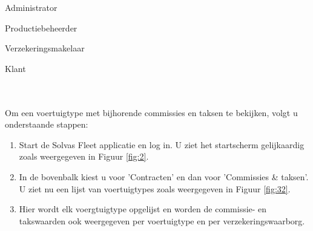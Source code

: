 \documentclass[11pt,openany]{article}
\newcommand{\cmark}{\ding{51}}%
\newcommand{\xmark}{\ding{55}}%
\newcommand{\done}{\rlap{$\square$}{\raisebox{2pt}{\large\hspace{1pt}\cmark}}%
	\hspace{-2.5pt}}
\newcommand{\wontfix}{\rlap{$\square$}{\large\hspace{1pt}\xmark}}
\begin{document}
\begin{todolist}
	\item[\done] Administrator
	\item[\done] Productiebeheerder
	\item[\done] Verzekeringsmakelaar
	\item[\wontfix] Klant 
\end{todolist}
\\
\\
Om een voertuigtype met bijhorende commissies en taksen te bekijken, volgt u onderstaande stappen:
\begin{enumerate}
	\item Start de Solvas Fleet applicatie en log in. U ziet het startscherm gelijkaardig zoals weergegeven in Figuur \ref{fig:2}.
	\item In de bovenbalk kiest u voor 'Contracten' en dan voor 'Commissies \& taksen'. U ziet nu een lijst van voertuigtypes zoals weergegeven in Figuur \ref{fig:32}.
	\item Hier wordt elk voergtuigtype opgelijst en worden de commissie- en takswaarden ook weergegeven per voertuigtype en per verzekeringswaarborg.
	
\end{enumerate}
\newpage
\end{document}
